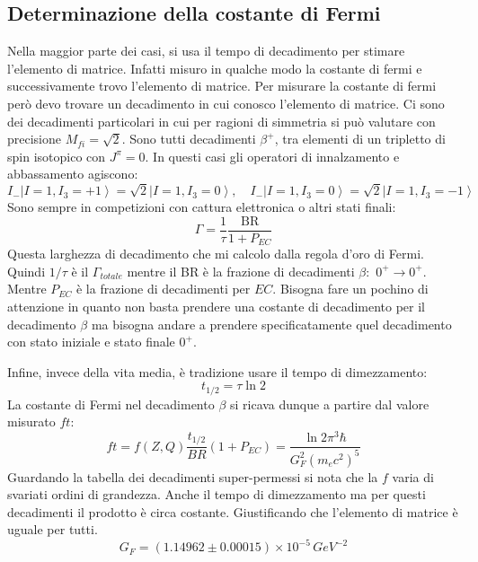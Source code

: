 \subsection{Determinazione della costante di Fermi}
Nella maggior parte dei casi, si usa il tempo di decadimento per stimare l'elemento di matrice. Infatti misuro in qualche modo la costante di fermi e successivamente trovo l'elemento di matrice. Per misurare la costante di fermi però devo trovare un decadimento in cui conosco l'elemento di matrice. Ci sono dei decadimenti particolari in cui per ragioni di simmetria si può valutare con precisione $M_{fi}=\sqrt{2}$. Sono tutti decadimenti $\beta^+$, tra elementi di un tripletto di spin isotopico con $J^\pi=0$. In questi casi gli operatori di innalzamento e abbassamento agiscono:
\begin{equation*}
    I_{-}\left|I=1, I_3=+1\right\rangle=\sqrt{2}\left|I=1, I_3=0\right\rangle, \quad I_{-}\left|I=1, I_3=0\right\rangle=\sqrt{2}\left|I=1, I_3=-1\right\rangle
\end{equation*}
Sono sempre in competizioni con cattura elettronica o altri stati finali:
\begin{equation*}
    \Gamma=\frac{1}{\tau}\frac{\text{BR}}{1+P_{EC}}
\end{equation*}
Questa larghezza di decadimento che mi calcolo dalla regola d'oro di Fermi. Quindi $1/\tau$ è il $\Gamma_{totale}$ mentre il BR è la frazione di decadimenti $\beta:\,\,0^+\to0^+$. Mentre $P_{EC}$ è la frazione di decadimenti per $EC$. Bisogna fare un pochino di attenzione in quanto non basta prendere una costante di decadimento per il decadimento $\beta$ ma bisogna andare a prendere specificatamente quel decadimento con stato iniziale e stato finale $0^+$.

Infine, invece della vita media, è tradizione usare il tempo di dimezzamento:
\begin{equation*}
    t_{1/2}=\tau\ln{2}
\end{equation*}
La costante di Fermi nel decadimento $\beta$ si ricava dunque a partire dal valore misurato $ft$:
\begin{equation*}
  ft=f(Z, Q) \frac{t_{1 / 2}}{B R}\left(1+P_{E C}\right)=\frac{\ln 2 \pi^3 \hbar}{G_F^2\left(m_e c^2\right)^5}
\end{equation*}
Guardando la tabella dei decadimenti super-permessi si nota che la $f$ varia di svariati ordini di grandezza. Anche il tempo di dimezzamento ma per questi decadimenti il prodotto è circa costante. Giustificando che l'elemento di matrice è uguale per tutti. 
\begin{equation*}
    G_F=(1.14962\pm0.00015)\times 10^{-5}\,GeV^{-2}
\end{equation*}
